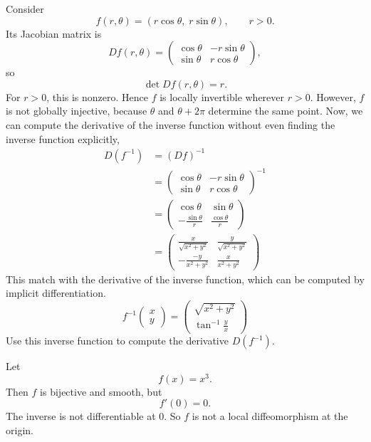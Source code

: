 \begin{example}
Consider
\[
f(r,\theta)=(r\cos\theta,\;r\sin\theta),
\qquad r>0.
\]
Its Jacobian matrix is
\[
Df(r,\theta)=
\begin{pmatrix}
\cos\theta & -r\sin\theta\\
\sin\theta & r\cos\theta
\end{pmatrix},
\]
so
\[
\det Df(r,\theta)=r.
\]
For \(r>0\), this is nonzero. Hence \(f\) is locally invertible wherever \(r>0\). However, \(f\) is not globally injective, because \(\theta\) and \(\theta+2\pi\) determine the same point. Now, we 
can compute the derivative of the inverse function without even finding the inverse function explicitly, 
\begin{align*}
    D(f^{-1})&=(Df)^{-1}\\
    &= \begin{pmatrix}
\cos\theta & -r\sin\theta\\
\sin\theta & r\cos\theta
\end{pmatrix}^{-1}\\
&=\begin{pmatrix}
    \cos\theta & \sin\theta\\
    -\frac{\sin\theta}{r}& \frac{\cos\theta}{r}
\end{pmatrix}\\
&=\begin{pmatrix}
    \frac{x}{\sqrt{x^2+y^2}}&\frac{y}{\sqrt{x^2+y^2}}\\
    -\frac{-y}{x^2+y^2}& \frac{x}{x^2+y^2}
\end{pmatrix} 
\end{align*}
This match with the derivative of the inverse function, which can be computed by implicit differentiation.
$$
f^{-1}\begin{pmatrix}
    x\\y
\end{pmatrix}=\begin{pmatrix}
    \sqrt{x^2+y^2}\\ 
    \tan^{-1}\frac{y}{x}
\end{pmatrix}
$$
Use this inverse function to compute the derivative $D(f^{-1})$.
\end{example}

\begin{example}
Let
\[
f(x)=x^3.
\]
Then \(f\) is bijective and smooth, but
\[
f'(0)=0.
\]
The inverse is not differentiable at \(0\). So \(f\) is not a local diffeomorphism at the origin.
\end{example}

